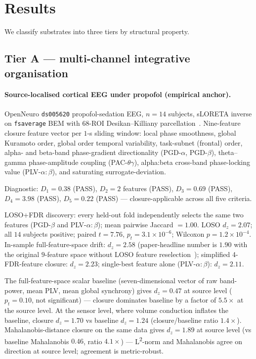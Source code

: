\documentclass[11pt,a4paper]{article}
\begin{document}
\section{Results}\label{sec:results}

We classify substrates into three tiers by structural property.

\subsection{Tier A --- multi-channel integrative organisation}\label{sec:results-tier-a}

\paragraph{Source-localised cortical EEG under propofol (empirical anchor).}
OpenNeuro \texttt{ds005620} propofol-sedation EEG, $n = 14$ subjects, sLORETA inverse on \texttt{fsaverage} BEM with $68$-ROI Desikan--Killiany parcellation~\citep{gramfort2014mne}. Nine-feature closure feature vector per $1$-s sliding window: local phase smoothness, global Kuramoto order, global order temporal variability, task-subnet (frontal) order, alpha- and beta-band phase-gradient directionality (PGD-$\alpha$, PGD-$\beta$), theta--gamma phase-amplitude coupling (PAC-$\theta\gamma$), alpha:beta cross-band phase-locking value (PLV-$\alpha{:}\beta$), and saturating surrogate-deviation.

Diagnostic: $D_1 = 0.38$ (PASS), $D_2 = 2$ features (PASS), $D_3 = 0.69$ (PASS), $D_4 = 3.98$ (PASS), $D_5 = 0.22$ (PASS) --- closure-applicable across all five criteria.

LOSO+FDR discovery: every held-out fold independently selects the same two features (PGD-$\beta$ and PLV-$\alpha{:}\beta$); mean pairwise Jaccard $= 1.00$. LOSO $d_z = 2.07$; all $14$ subjects positive; paired $t = 7.76$, $p_t = 3.1 \times 10^{-6}$; Wilcoxon $p = 1.2 \times 10^{-4}$. In-sample full-feature-space drift: $d_z = 2.58$ (paper-headline number is $1.90$ with the original $9$-feature space without LOSO feature reselection~\citep{SolutionLab002}); simplified 4-FDR-feature closure: $d_z = 2.23$; single-best feature alone (PLV-$\alpha{:}\beta$): $d_z = 2.11$.

The full-feature-space scalar baseline (seven-dimensional vector of raw band-power, mean PLV, mean global synchrony) gives $d_z = 0.47$ at source level ($p_t = 0.10$, not significant) --- closure dominates baseline by a factor of $5.5\times$ at the source level. At the sensor level, where volume conduction inflates the baseline, closure $d_z = 1.70$ vs baseline $d_z = 1.24$ (closure/baseline ratio $1.4\times$). Mahalanobis-distance closure on the same data gives $d_z = 1.89$ at source level (vs baseline Mahalanobis $0.46$, ratio $4.1\times$) --- L\textsuperscript{2}-norm and Mahalanobis agree on direction at source level; agreement is metric-robust.
\end{document}
